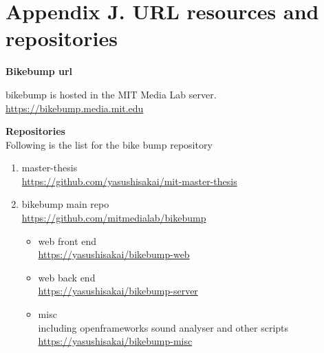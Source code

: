 \chapter{Appendix J. URL resources and repositories}
\label{appj:repo}

\textbf{Bikebump url}

bikebump is hosted in the MIT Media Lab server.
\url{https://bikebump.media.mit.edu}

\textbf{Repositories}\\
Following is the list for the bike bump repository

\begin{enumerate}
    \item master-thesis\\
    \url{https://github.com/yasushisakai/mit-master-thesis}
    \item bikebump main repo\\
    \url{https://github.com/mitmedialab/bikebump}
        \begin{itemize}
            \item web front end\\
            \url{https://yasushisakai/bikebump-web}
            \item web back end\\
            \url{https://yasushisakai/bikebump-server}
            \item misc\\
            including openframeworks sound analyser and other scripts
            \url{https://yasushisakai/bikebump-misc}
        \end{itemize}
\end{enumerate}
